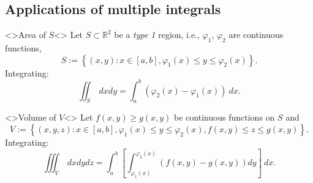 \documentclass[aspectratio=169,handout]{beamer}
\newcommand{\bR}{\mathbb{R}} %
\begin{document}
\subsection{Applications of multiple integrals}

\begin{frame}
 
        \begin{block}<>{Area of \(S\)}<>
            Let    \(S \subset \bR^2\)  be a \emph{type 1} region, i.e.,   \(\varphi_1\), \(\varphi_2\) are continuous functions,
            \[ 
                S := \left\{(x,y): x \in [a,b], \varphi_1(x) \leq y \leq \varphi_2(x)\right\}.
            \]
            Integrating:
            \[
                \iint_{S} \ dx dy = \int_{a}^{b}( \varphi_2(x) - \varphi_1(x)) \ dx.
            \]
        \end{block}

        \begin{block}<>{Volume of \(V\)}<>
            Let \(f(x,y) \geq g(x,y)\) be continuous functions on \(S\) and
            \[
                V := \left\{ (x,y,z) :  x \in [a,b], \varphi_1(x) \leq y \leq \varphi_2(x), f(x,y) \leq z \leq g(x,y)  \right\}.
            \]
            Integrating:
            \[
                \iiint_{V} \ dxdydz =  \int_{a}^{b}  
                \left[ \int_{\varphi_1(x)}^{\varphi_2(x)}   ( f(x,y)  -  g(x,y)) dy \right] \ dx.
            \]
        \end{block}
\end{frame}
\end{document}

